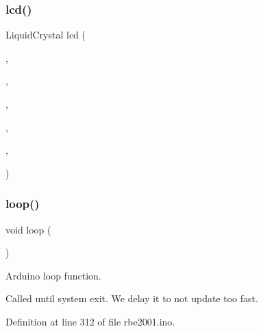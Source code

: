 \subsubsection{\texorpdfstring{lcd()}{lcd()}}
{\footnotesize\ttfamily Liquid\+Crystal lcd (\begin{DoxyParamCaption}\item[{\hyperlink{config_8h_a4781e073871c6f27f89b9463ad3a4ed1}{L\+C\+D\+\_\+\+RS}}]{,  }\item[{\hyperlink{config_8h_a6ec15b1e813d1f56d2eb644a127e5d49}{L\+C\+D\+\_\+E}}]{,  }\item[{\hyperlink{config_8h_ade7e247311032a474711416da480ed8b}{L\+C\+D\+\_\+\+D4}}]{,  }\item[{\hyperlink{config_8h_a5b91fe480c768d4f246f3890207bfbfc}{L\+C\+D\+\_\+\+D5}}]{,  }\item[{\hyperlink{config_8h_a72e105fcda5fd1c07b5f391379a439d4}{L\+C\+D\+\_\+\+D6}}]{,  }\item[{\hyperlink{config_8h_abd65075e01c7413419581aedee5bcc24}{L\+C\+D\+\_\+\+D7}}]{ }\end{DoxyParamCaption})}

\mbox{\label{rbe2001_8ino_afe461d27b9c48d5921c00d521181f12f}} 
\subsubsection{\texorpdfstring{loop()}{loop()}}
{\footnotesize\ttfamily void loop (\begin{DoxyParamCaption}{ }\end{DoxyParamCaption})}



Arduino loop function. 

Called until system exit. We delay it to not update too fast. 

Definition at line 312 of file rbe2001.\+ino.


